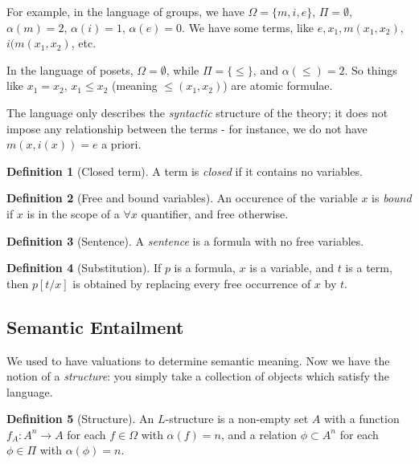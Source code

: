 \documentclass{article}
\theoremstyle{definition}
\newtheorem{definition}{Definition}
\numberwithin{definition}{section}
\begin{document}
For example, in the language of groups, we have $\Omega = \{m,i,e\}$, 
$\Pi = \emptyset$, $\alpha(m) = 2$, $\alpha(i) = 1$, $\alpha(e) = 0$. 
We have some terms, like $e,x_{1},m(x_{1},x_{2})$, $i(m(x_{1},x_{2})$, etc. 

In the language of posets, $\Omega = \emptyset$, while $\Pi = \{\le \}$, 
and $\alpha(\le) = 2$. So things like $x_{1} = x_{2}$, 
$x_{1} \le x_{2}$ (meaning $\le(x_{1},x_{2})$) are atomic formulae. 

The language only describes the \textit{syntactic} structure of the theory; 
it does not impose any relationship between the terms - for instance, 
we do not have $m(x,i(x)) = e$ a priori.

\begin{definition}[Closed term]
  A term is \emph{closed} if it contains no variables.
\end{definition} 

\begin{definition}[Free and bound variables]
  An occurence of the variable $x$ is \textit{bound} if $x$ is 
  in the scope of a $\forall x$ quantifier, and free otherwise.  
\end{definition}

\begin{definition}[Sentence]
  A \textit{sentence} is a formula with no free variables. 
\end{definition}

\begin{definition}[Substitution]
  If $p$ is a formula, $x$ is a variable, and $t$ is a term, 
  then $p[t/x]$ is obtained by replacing every free occurrence of $x$ by $t$. 
\end{definition}

\subsection{Semantic Entailment}
  We used to have valuations to determine semantic meaning. 
  Now we have the notion of a \textit{structure}: 
  you simply take a collection of objects which satisfy the language. 

\begin{definition}[Structure]
  An $L$-structure is a non-empty set $A$ with 
  a function $f_{A}:A^{n} \to A$ for each $f \in \Omega$ with $\alpha(f) = n$, 
  and a relation $\phi \subset A^{n}$ for each $\phi \in \Pi$ with $\alpha(\phi) = n$. 
\end{definition}
\end{document}
